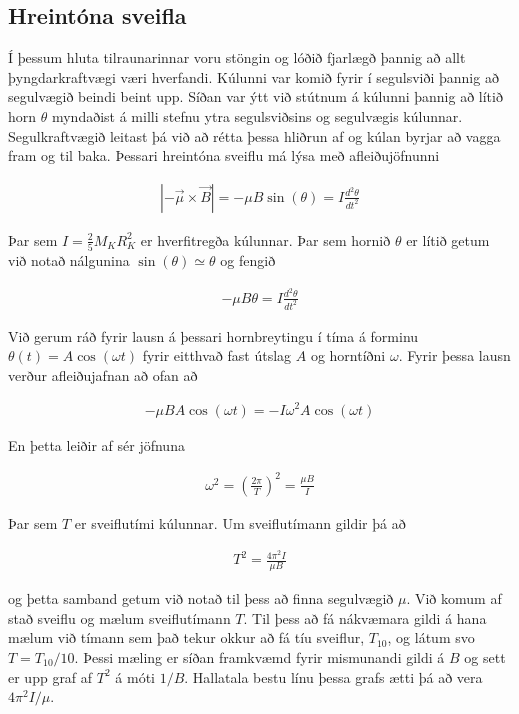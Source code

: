 \documentclass[11pt]{article}
\begin{document}
\subsection{Hreintóna sveifla}
Í þessum hluta tilraunarinnar voru stöngin og lóðið fjarlægð þannig að allt þyngdarkraftvægi væri hverfandi. Kúlunni var komið fyrir í segulsviði þannig að segulvægið beindi beint upp. Síðan var ýtt við stútnum á kúlunni þannig að lítið horn $\theta$ myndaðist á milli stefnu ytra segulsviðsins og segulvægis kúlunnar. Segulkraftvægið leitast þá við að rétta þessa hliðrun af og kúlan byrjar að vagga fram og til baka. Þessari hreintóna sveiflu má lýsa með afleiðujöfnunni 

\begin{align}
|-\Vec{\mu} \times \Vec{B}| = -\mu B \sin(\theta) = I \frac{d^2 \theta}{dt^2}
\end{align}

Þar sem $I = \frac{2}{5}M_K R_K^2$ er hverfitregða kúlunnar. Þar sem hornið $\theta$ er lítið getum við notað nálgunina $\sin(\theta) \simeq \theta$ og fengið

\begin{align}
-\mu B \theta = I\frac{d^2\theta}{dt^2}
\end{align}

Við gerum ráð fyrir lausn á þessari hornbreytingu í tíma á forminu $\theta(t) = A\cos(\omega t)$ fyrir eitthvað fast útslag $A$ og horntíðni $\omega$. Fyrir þessa lausn verður afleiðujafnan að ofan að

\begin{align}
-\mu B A\cos(\omega t) = -I\omega^2 A \cos(\omega t)
\end{align}

En þetta leiðir af sér jöfnuna

\begin{align}
\omega^2 = \left( \frac{2\pi}{T} \right)^2 = \frac{\mu B}{I}
\end{align}

Þar sem $T$ er sveiflutími kúlunnar. Um sveiflutímann gildir þá að 

\begin{align}
T^2 = \frac{4\pi^2 I}{\mu B}
\end{align}

og þetta samband getum við notað til þess að finna segulvægið $\mu$. Við komum af stað sveiflu og mælum sveiflutímann $T$. Til þess að fá nákvæmara gildi á hana mælum við tímann sem það tekur okkur að fá tíu sveiflur, $T_{10}$, og látum svo $T = T_{10}/10$. Þessi mæling er síðan framkvæmd fyrir mismunandi gildi á $B$ og sett er upp graf af $T^2$ á móti $1/B$. Hallatala bestu línu þessa grafs ætti þá að vera $4\pi^2I/\mu$.
\end{document}
